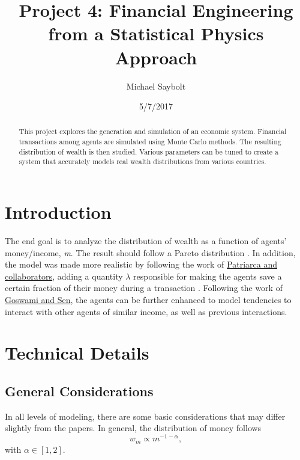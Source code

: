 \documentclass[12pt]{article} %
\begin{document}
\title{Project 4: Financial Engineering from a Statistical Physics Approach}
\author{Michael Saybolt}
\date{5/7/2017}
\maketitle
\pagebreak

\tableofcontents

\begin{abstract} %
This project explores the generation and simulation of an economic system. Financial transactions among agents are simulated using Monte Carlo methods. The resulting distribution of wealth is then studied. Various parameters can be tuned to create a system that accurately models real wealth distributions from various countries.
\end{abstract}

\section{Introduction} %
The end goal is to analyze the distribution of wealth as a function of agents'
money/income, \textit{m}. The result should follow a Pareto distribution
\cite{Pareto}. In addition, the model was made more realistic by following the
work of
\href{{http://www.sciencedirect.com/science/article/pii/S0378437104004327}}{Patriarca
and collaborators}, adding a quantity $\lambda$ responsible for making the
agents save a certain fraction of their money during a transaction
\cite{Patriarca}.
Following the work of
\href{{http://www.sciencedirect.com/science/article/pii/S0378437114006967}}{Goswami
and Sen}, the agents can be further enhanced to model tendencies to interact
with other agents of similar income, as well as previous
interactions\cite{Goswami}.


\section{Technical Details}
\subsection{General Considerations}
In all levels of modeling, there are some basic considerations that may differ
slightly from the papers. In general, the distribution of money follows
\[
w_m\propto m^{-1-\alpha},
\]
with $\alpha\in [1,2]$\cite{Pareto}.
\end{document}
